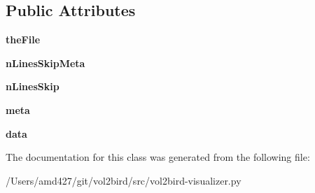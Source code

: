 \subsection*{Public Attributes}
\begin{DoxyCompactItemize}
\item 
\mbox{\label{classvol2bird-visualizer_1_1Vol2birdVisualizer_aefc94c184178b806b1ea508236a5da34}} 
{\bfseries the\+File}
\item 
\mbox{\label{classvol2bird-visualizer_1_1Vol2birdVisualizer_ac900c489a4be79869fceb7ea2f1428f0}} 
{\bfseries n\+Lines\+Skip\+Meta}
\item 
\mbox{\label{classvol2bird-visualizer_1_1Vol2birdVisualizer_aa65afff210c6f7b18cb5ba25ce1b46a5}} 
{\bfseries n\+Lines\+Skip}
\item 
\mbox{\label{classvol2bird-visualizer_1_1Vol2birdVisualizer_aaeeb562ba42c16cef75fd4e23a7de3f3}} 
{\bfseries meta}
\item 
\mbox{\label{classvol2bird-visualizer_1_1Vol2birdVisualizer_a3fb2cca53e09c39e5ae4cf96f308cd5b}} 
{\bfseries data}
\end{DoxyCompactItemize}


The documentation for this class was generated from the following file\+:\begin{DoxyCompactItemize}
\item 
/\+Users/amd427/git/vol2bird/src/vol2bird-\/visualizer.\+py\end{DoxyCompactItemize}
